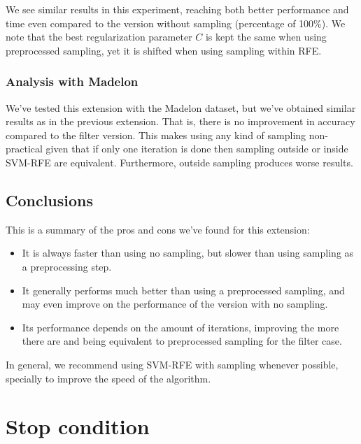 We see similar results in this experiment, reaching both better performance and time even compared to the version without sampling (percentage of 100\%). We note that the best regularization parameter $C$ is kept the same when using preprocessed sampling, yet it is shifted when using sampling within RFE.

\subsubsection*{Analysis with Madelon}

We've tested this extension with the Madelon dataset, but we've obtained similar results as in the previous extension. That is, there is no improvement in accuracy compared to the filter version. This makes using any kind of sampling non-practical given that if only one iteration is done then sampling outside or inside SVM-RFE are equivalent. Furthermore, outside sampling produces worse results.

\subsection{Conclusions}

This is a summary of the pros and cons we've found for this extension:

\begin{itemize}
    \item It is always faster than using no sampling, but slower than using sampling as a preprocessing step.
    \item It generally performs much better than using a preprocessed sampling, and may even improve on the performance of the version with no sampling.
    \item Its performance depends on the amount of iterations, improving the more there are and being equivalent to preprocessed sampling for the filter case.
\end{itemize}

In general, we recommend using SVM-RFE with sampling whenever possible, specially to improve the speed of the algorithm.


\section{Stop condition}

